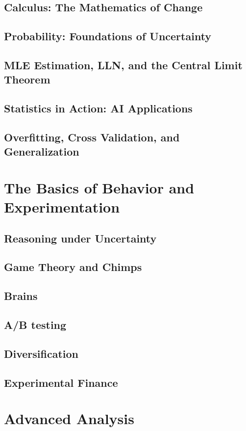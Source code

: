 \section{Calculus: The Mathematics of Change}
\section{Probability: Foundations of Uncertainty}
\section{MLE Estimation, LLN, and the Central Limit Theorem}
\section{Statistics in Action: AI Applications}
\section{Overfitting, Cross Validation, and Generalization}

\chapter{The Basics of Behavior and Experimentation}
\section{Reasoning under Uncertainty}
\section{Game Theory and Chimps}
\section{Brains}
\section{A/B testing}
\section{Diversification}
\section{Experimental Finance}

\chapter{Advanced Analysis}
